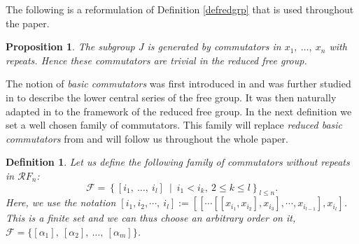 \documentclass[11pt, a4paper, twoside,reqno]{amsart}
\newtheorem{prop}[thm]{Proposition}
\newtheorem{defn}[thm]{Definition}
\begin{document}
The following is a reformulation of Definition \ref{defredgrp} that is used throughout the paper.
\begin{prop}\label{propcommurep}
\cite[Proposition 3]{Levine4comp} The subgroup $J$ is generated by commutators in $x_1,\ \ldots,\ x_n$ with repeats. Hence these commutators are trivial in the reduced free group.
\end{prop}
The notion of \emph{basic commutators} was first introduced in \cite{Phall} and was further studied in \cite{LyndonRogerSchuppPaulCobigrpthry,Mhall,MagnusKarrassSolitar} to describe the lower central series of the free group. It was then naturally adapted in \cite{Levine4comp} to the framework of the reduced free group. In the next definition we set a well chosen family of commutators. This family will replace \emph{reduced basic commutators} from \cite{Levine4comp} and will follow us throughout the whole paper.
\begin{defn}\label{basiscommudef}
Let us define the following family of commutators without repeats in $\mathcal{R}F_n$: $$\mathcal F=\left\{[i_1,\ \ldots,\ i_l]\ \middle|\  i_1<i_k,\  2\leq k\leq l\right\}_{l\leq n}.$$
Here, we use the notation $[i_1,i_2,\cdots,\ i_l]:=[[\cdots[[x_{i_1},x_{i_2}],x_{i_3}],\cdots,x_{i_{l-1}}],x_{i_l}]$. This is a finite set and we can thus choose an arbitrary order on it, $\mathcal{F}=\{[\alpha_1],\ [\alpha_2],\ \ldots,\ [\alpha_m]\}$.
\end{defn}
\end{document}
